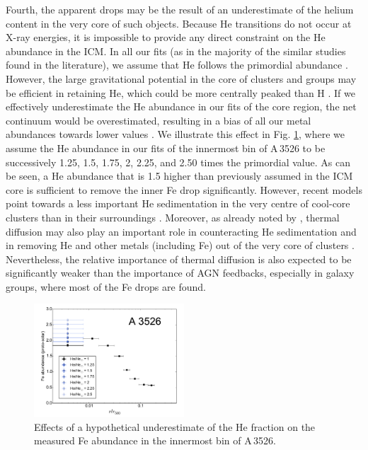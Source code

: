 \documentclass{aa}
\begin{document}
Fourth, the apparent drops may be the result of an underestimate of the helium content in the very core of such objects. Because He transitions do not occur at X-ray energies, it is impossible to provide any direct constraint on the He abundance in the ICM.
In all our fits (as in the majority of the similar studies found in the literature), we assume that He follows the primordial abundance \citep[$\sim$25\% of mass fraction; e.g.][]{2016arXiv160802062P}. However, the large gravitational potential in the core of clusters and groups may be efficient in retaining He, which could be more centrally peaked than H \citep{1977MNRAS.181P...5F,1981ApJ...248..429A}. If we effectively underestimate the He abundance in our fits of the core region, the net continuum would be overestimated, resulting in a bias of all our metal abundances towards lower values \citep[e.g.][]{2006MNRAS.369L..42E}. We illustrate this effect in Fig. \ref{fig:Fe_A3526_He}, where we assume the He abundance in our fits of the innermost bin of A\,3526 to be successively 1.25, 1.5, 1.75, 2, 2.25, and 2.50 times the primordial value. As can be seen, a He abundance that is 1.5 higher than previously assumed in the ICM core is sufficient to remove the inner Fe drop significantly. 
However, recent models point towards a less important He sedimentation in the very centre of cool-core clusters than in their surroundings \citep[$\sim$0.4--0.8$r_{500}$;][]{2009ApJ...693..839P}. Moreover, as already noted by \citet{2015MNRAS.447..417P}, thermal diffusion may also play an important role in counteracting He sedimentation and in removing He and other metals (including Fe) out of the very core of clusters \citep[Medvedev et al. \citeyear{2014MNRAS.440.2464M}; see also][]{2016ApJ...824...32B,2016ApJ...833..164B}. Nevertheless, the relative importance of thermal diffusion is also expected to be significantly weaker than the importance of AGN feedbacks, especially in galaxy groups, where most of the Fe drops are found.


\begin{figure}[!]

                \includegraphics[width=0.5\textwidth]{fig_A3526_He.pdf}

        \caption{Effects of a hypothetical underestimate of the He fraction on the measured Fe abundance in the innermost bin of A\,3526.}
\label{fig:Fe_A3526_He}
\end{figure}
\end{document}
